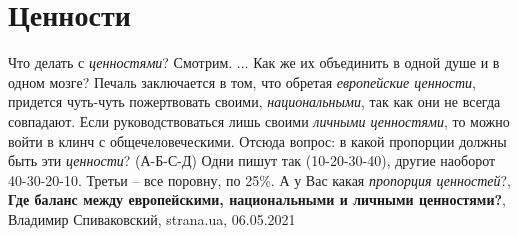  
 
 
 
 
\chapter{Ценности}

Что делать с \emph{ценностями}? Смотрим. ...  Как же их объединить в одной душе
и в одном мозге?  Печаль заключается в том, что обретая \emph{европейские
ценности}, придется чуть-чуть пожертвовать своими, \emph{национальными}, так
как они не всегда совпадают.  Если руководствоваться лишь своими \emph{личными
ценностями}, то можно войти в клинч с общечеловеческими.  Отсюда вопрос: в
какой пропорции должны быть эти \emph{ценности}? (А-Б-С-Д) Одни пишут так
(10-20-30-40), другие наоборот 40-30-20-10. Третьи – все поровну, по 25\%.  А у
Вас какая \emph{пропорция ценностей}?,
\textbf{Где баланс между европейскими, национальными и личными ценностями?},
Владимир Спиваковский, strana.ua, 06.05.2021

